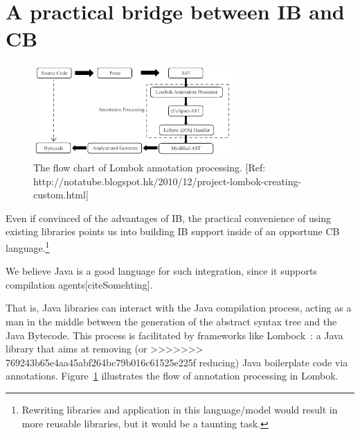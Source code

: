 \section{A practical bridge between IB and CB}

\begin{figure}[t]\label{fig:lombok}
\centering
\includegraphics[width=3in]{pdfs/lombok.png}
\caption{The flow chart of Lombok annotation processing. [Ref: http://notatube.blogspot.hk/2010/12/project-lombok-creating-custom.html]
}
\end{figure}


Even if convinced of the advantages of IB,
the practical convenience
of using existing libraries points us into building IB support
inside of an opportune CB language.\footnote{
Rewriting libraries and application in this language/model
would result in more reusable libraries, but it would be a taunting task.}


We believe Java is a good language for such integration, since it supports compilation agents[citeSomehting].

That is, Java libraries can interact with the Java compilation process,
acting as a man in the middle between the 
generation of the abstract syntax tree and the Java Bytecode.
This process is facilitated by frameworks like Lombock~\cite{lombok}:
a Java library that aims at removing (or
>>>>>>> 769243b65e4aa45abf264bc79b016c61525e225f
reducing) Java boilerplate code via
annotations.
Figure~\ref{fig:lombok} illustrates the
flow of \mixin annotation processing in Lombok.

